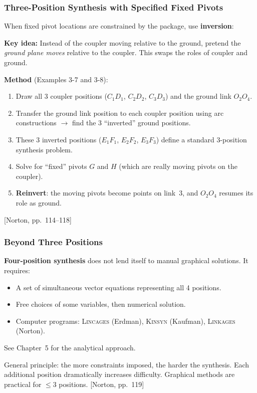 \documentclass[10pt,aspectratio=43]{beamer}
\newcommand{\pref}[1]{\vfill\hfill{\scriptsize\color{gray}[Norton, pp.~#1]}}
\begin{document}
\begin{frame}
\frametitle{Three-Position Synthesis with Specified Fixed Pivots}

When fixed pivot locations are constrained by the package, use \textbf{inversion}:

\vspace{4pt}
\begin{yellowbox}
\textbf{Key idea:} Instead of the coupler moving relative to the ground, pretend the \emph{ground plane moves} relative to the coupler. This swaps the roles of coupler and ground.
\end{yellowbox}

\vspace{4pt}
\textbf{Method} (Examples 3-7 and 3-8):
\begin{enumerate}
  \item Draw all 3 coupler positions ($C_1D_1$, $C_2D_2$, $C_3D_3$) and the ground link $O_2O_4$.
  \item Transfer the ground link position to each coupler position using arc constructions $\to$ find the 3 ``inverted'' ground positions.
  \item These 3 inverted positions ($E_1F_1$, $E_2F_2$, $E_3F_3$) define a standard 3-position synthesis problem.
  \item Solve for ``fixed'' pivots $G$ and $H$ (which are really moving pivots on the coupler).
  \item \textbf{Reinvert}: the moving pivots become points on link~3, and $O_2O_4$ resumes its role as ground.
\end{enumerate}
\pref{114--118}
\end{frame}

\begin{frame}
\frametitle{Beyond Three Positions}

\begin{redbox}
\textbf{Four-position synthesis} does not lend itself to manual graphical solutions. It requires:
\begin{itemize}
  \item A set of simultaneous vector equations representing all 4 positions.
  \item Free choices of some variables, then numerical solution.
  \item Computer programs: \textsc{Lincages} (Erdman), \textsc{Kinsyn} (Kaufman), \textsc{Linkages} (Norton).
\end{itemize}
See Chapter~5 for the analytical approach.
\end{redbox}

\vspace{6pt}
General principle: the more constraints imposed, the harder the synthesis. Each additional position dramatically increases difficulty. Graphical methods are practical for $\leq 3$ positions.
\pref{119}
\end{frame}
\end{document}
